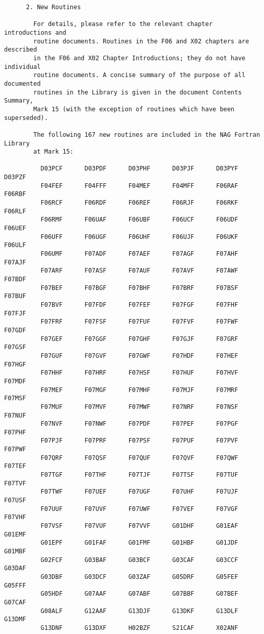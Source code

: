 \begin{small}
\begin{verbatim}
      2. New Routines

        For details, please refer to the relevant chapter introductions and
        routine documents. Routines in the F06 and X02 chapters are described
        in the F06 and X02 Chapter Introductions; they do not have individual
        routine documents. A concise summary of the purpose of all documented
        routines in the Library is given in the document Contents Summary,
        Mark 15 (with the exception of routines which have been superseded).

        The following 167 new routines are included in the NAG Fortran Library
        at Mark 15:

          D03PCF      D03PDF      D03PHF      D03PJF      D03PYF      D03PZF
          F04FEF      F04FFF      F04MEF      F04MFF      F06RAF      F06RBF
          F06RCF      F06RDF      F06REF      F06RJF      F06RKF      F06RLF
          F06RMF      F06UAF      F06UBF      F06UCF      F06UDF      F06UEF
          F06UFF      F06UGF      F06UHF      F06UJF      F06UKF      F06ULF
          F06UMF      F07ADF      F07AEF      F07AGF      F07AHF      F07AJF
          F07ARF      F07ASF      F07AUF      F07AVF      F07AWF      F07BDF
          F07BEF      F07BGF      F07BHF      F07BRF      F07BSF      F07BUF
          F07BVF      F07FDF      F07FEF      F07FGF      F07FHF      F07FJF
          F07FRF      F07FSF      F07FUF      F07FVF      F07FWF      F07GDF
          F07GEF      F07GGF      F07GHF      F07GJF      F07GRF      F07GSF
          F07GUF      F07GVF      F07GWF      F07HDF      F07HEF      F07HGF
          F07HHF      F07HRF      F07HSF      F07HUF      F07HVF      F07MDF
          F07MEF      F07MGF      F07MHF      F07MJF      F07MRF      F07MSF
          F07MUF      F07MVF      F07MWF      F07NRF      F07NSF      F07NUF
          F07NVF      F07NWF      F07PDF      F07PEF      F07PGF      F07PHF
          F07PJF      F07PRF      F07PSF      F07PUF      F07PVF      F07PWF
          F07QRF      F07QSF      F07QUF      F07QVF      F07QWF      F07TEF
          F07TGF      F07THF      F07TJF      F07TSF      F07TUF      F07TVF
          F07TWF      F07UEF      F07UGF      F07UHF      F07UJF      F07USF
          F07UUF      F07UVF      F07UWF      F07VEF      F07VGF      F07VHF
          F07VSF      F07VUF      F07VVF      G01DHF      G01EAF      G01EMF
          G01EPF      G01FAF      G01FMF      G01HBF      G01JDF      G01MBF
          G02FCF      G03BAF      G03BCF      G03CAF      G03CCF      G03DAF
          G03DBF      G03DCF      G03ZAF      G05DRF      G05FEF      G05FFF
          G05HDF      G07AAF      G07ABF      G07BBF      G07BEF      G07CAF
          G08ALF      G12AAF      G13DJF      G13DKF      G13DLF      G13DMF
          G13DNF      G13DXF      H02BZF      S21CAF      X02ANF



\end{verbatim}
\end{small}
